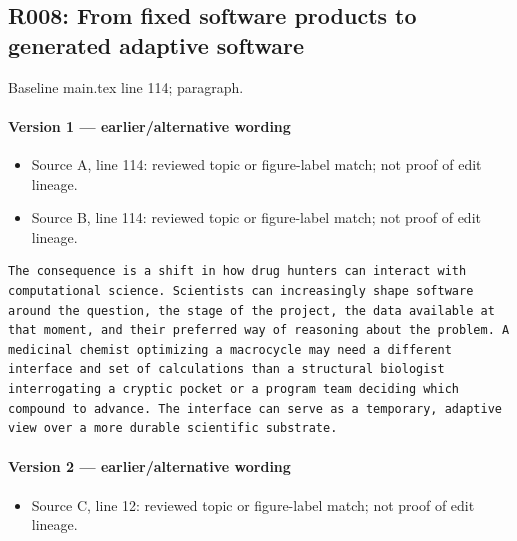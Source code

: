 \documentclass[11pt]{article}
\begin{document}
\subsection{R008: From fixed software products to generated adaptive software}

Baseline main.tex line 114; paragraph.

\paragraph{Version 1 --- earlier/alternative wording}

\begin{itemize}[leftmargin=*]
\item Source A, line 114: reviewed topic or figure-label match; not proof of edit lineage.
\item Source B, line 114: reviewed topic or figure-label match; not proof of edit lineage.
\end{itemize}

\begin{lstlisting}
The consequence is a shift in how drug hunters can interact with computational science. Scientists can increasingly shape software around the question, the stage of the project, the data available at that moment, and their preferred way of reasoning about the problem. A medicinal chemist optimizing a macrocycle may need a different interface and set of calculations than a structural biologist interrogating a cryptic pocket or a program team deciding which compound to advance. The interface can serve as a temporary, adaptive view over a more durable scientific substrate.
\end{lstlisting}

\paragraph{Version 2 --- earlier/alternative wording}

\begin{itemize}[leftmargin=*]
\item Source C, line 12: reviewed topic or figure-label match; not proof of edit lineage.
\end{itemize}
\end{document}

